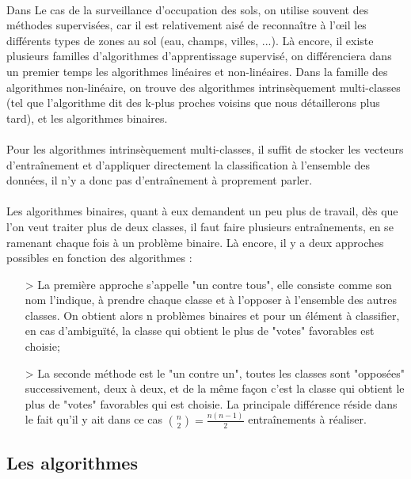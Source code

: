 \documentclass[a4paper,10pt]{report}
\begin{document}
\paragraph{}
Dans Le cas de la surveillance d'occupation des sols, on utilise souvent des méthodes supervisées, car il est relativement aisé de reconnaître à l'œil les différents types de zones au sol (eau, champs, villes, ...). Là encore, il existe plusieurs familles d'algorithmes d'apprentissage supervisé, on différenciera dans un premier temps les algorithmes linéaires et non-linéaires. Dans la famille des algorithmes non-linéaire, on trouve des algorithmes intrinsèquement multi-classes (tel que l'algorithme dit des k-plus proches voisins que nous détaillerons plus tard), et les algorithmes binaires.
\paragraph{}
Pour les algorithmes intrinsèquement multi-classes, il suffit de stocker les vecteurs d’entraînement et d'appliquer directement la classification à l'ensemble des données, il n'y a donc pas d’entraînement à proprement parler.
\paragraph{}
Les algorithmes binaires, quant à eux demandent un peu plus de travail, dès que l'on veut traiter plus de deux classes, il faut faire plusieurs entraînements, en se ramenant chaque fois à un problème binaire. Là encore, il y a deux approches possibles en fonction des algorithmes :
 \begin{itemize}
   \item[>] La première approche s'appelle "un contre tous", elle consiste comme son nom l'indique, à prendre chaque classe et à l'opposer à l'ensemble des autres classes. On obtient alors n problèmes binaires et pour un élément à classifier, en cas d'ambiguïté, la classe qui obtient le plus de "votes" favorables est choisie;
   \item[>] La seconde méthode est le "un contre un", toutes les classes sont "opposées" successivement, deux à deux, et de la même façon c'est la classe qui obtient le plus de "votes" favorables qui est choisie. La principale différence réside dans le fait qu'il y ait dans ce cas ${n \choose 2}=\frac{n(n-1)}{2}$ entraînements à réaliser.
 \end{itemize}
 \subsection{Les algorithmes}
\end{document}
